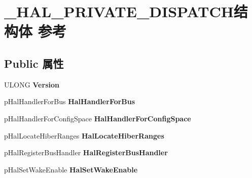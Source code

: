 \hypertarget{struct___h_a_l___p_r_i_v_a_t_e___d_i_s_p_a_t_c_h}{}\section{\+\_\+\+H\+A\+L\+\_\+\+P\+R\+I\+V\+A\+T\+E\+\_\+\+D\+I\+S\+P\+A\+T\+C\+H结构体 参考}
\label{struct___h_a_l___p_r_i_v_a_t_e___d_i_s_p_a_t_c_h}
\subsection*{Public 属性}
\begin{DoxyCompactItemize}
\item 
\mbox{\label{struct___h_a_l___p_r_i_v_a_t_e___d_i_s_p_a_t_c_h_a2fbc508f9cec5a6e6aa35d7ceb4ec233}} 
U\+L\+O\+NG {\bfseries Version}
\item 
\mbox{\label{struct___h_a_l___p_r_i_v_a_t_e___d_i_s_p_a_t_c_h_abb2f0bbf86e1cac9f0a34ab9d01a22fd}} 
p\+Hal\+Handler\+For\+Bus {\bfseries Hal\+Handler\+For\+Bus}
\item 
\mbox{\label{struct___h_a_l___p_r_i_v_a_t_e___d_i_s_p_a_t_c_h_ab7335904d0e6512280007f3b508caee7}} 
p\+Hal\+Handler\+For\+Config\+Space {\bfseries Hal\+Handler\+For\+Config\+Space}
\item 
\mbox{\label{struct___h_a_l___p_r_i_v_a_t_e___d_i_s_p_a_t_c_h_a16aebc132999ebcbd17a52efd01cd30c}} 
p\+Hal\+Locate\+Hiber\+Ranges {\bfseries Hal\+Locate\+Hiber\+Ranges}
\item 
\mbox{\label{struct___h_a_l___p_r_i_v_a_t_e___d_i_s_p_a_t_c_h_a84e0524b00eb0271c021639ce1ea02b7}} 
p\+Hal\+Register\+Bus\+Handler {\bfseries Hal\+Register\+Bus\+Handler}
\item 
\mbox{\label{struct___h_a_l___p_r_i_v_a_t_e___d_i_s_p_a_t_c_h_a16b613fc0d3f9c6b8e2a0250591e3913}} 
p\+Hal\+Set\+Wake\+Enable {\bfseries Hal\+Set\+Wake\+Enable}

\end{DoxyCompactItemize}
